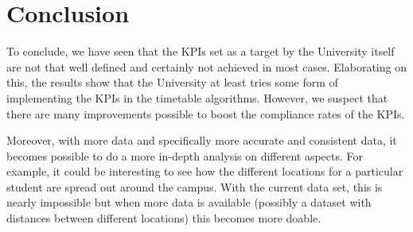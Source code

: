 \section{Conclusion}
To conclude, we have seen that the KPIs set as a target by the University itself are not that well defined and certainly not achieved in most cases. Elaborating on this, the results show that the University at least tries some form of implementing the KPIs in the timetable algorithms. However, we suspect that there are many improvements possible to boost the compliance rates of the KPIs.

Moreover, with more data and specifically more accurate and consistent data, it becomes possible to do a more in-depth analysis on different aspects. For example, it could be interesting to see how the different locations for a particular student are spread out around the campus. With the current data set, this is nearly impossible but when more data is available (possibly a dataset with distances between different locations) this becomes more doable.